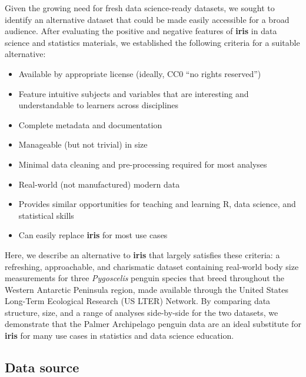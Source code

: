 Given the growing need for fresh data science-ready datasets, we sought
to identify an alternative dataset that could be made easily accessible
for a broad audience. After evaluating the positive and negative
features of \textbf{iris} in data science and statistics materials, we
established the following criteria for a suitable alternative:

\begin{itemize}
\tightlist
\item
  Available by appropriate license (ideally, CC0 ``no rights reserved'')
\item
  Feature intuitive subjects and variables that are interesting and
  understandable to learners across disciplines
\item
  Complete metadata and documentation
\item
  Manageable (but not trivial) in size
\item
  Minimal data cleaning and pre-processing required for most analyses
\item
  Real-world (not manufactured) modern data
\item
  Provides similar opportunities for teaching and learning R, data
  science, and statistical skills
\item
  Can easily replace \textbf{iris} for most use cases
\end{itemize}

Here, we describe an alternative to \textbf{iris} that largely satisfies
these criteria: a refreshing, approachable, and charismatic dataset
containing real-world body size measurements for three \emph{Pygoscelis}
penguin species that breed throughout the Western Antarctic Peninsula
region, made available through the United States Long-Term Ecological
Research (US LTER) Network. By comparing data structure, size, and a
range of analyses side-by-side for the two datasets, we demonstrate that
the Palmer Archipelago penguin data are an ideal substitute for
\textbf{iris} for many use cases in statistics and data science
education.

\hypertarget{data-source}{%
\subsection{Data source}\label{data-source}}

